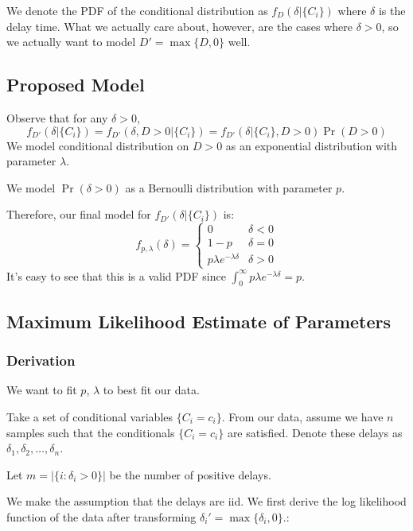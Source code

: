 \documentclass{article}
\begin{document}
We denote the PDF of the conditional distribution as $f_D(\delta|\{C_i\})$ where $\delta$ is the delay time. What we actually care about, however, are
the cases where $\delta > 0$, so we actually want to model $D' = \max \{D, 0\}$ well.

\subsection{Proposed Model}
Observe that for any $\delta > 0$,
$$f_{D'}(\delta | \{C_i\}) = f_{D'}(\delta, D > 0 | \{C_i\}) = f_{D'}(\delta | \{C_i\}, D > 0)\Pr(D > 0)$$
We model conditional distribution on $D > 0$ as an exponential distribution with parameter $\lambda$.

We model $\Pr(\delta > 0)$ as a Bernoulli distribution with parameter $p$.

Therefore, our final model for $f_{D'}(\delta | \{C_i\})$ is:
$$f_{p, \lambda}(\delta) = \begin{cases}
  0 & \delta < 0 \\
  1 - p & \delta = 0 \\
  p\lambda e^{-\lambda \delta} & \delta > 0
\end{cases}$$
It's easy to see that this is a valid PDF since $\int_0^\infty p\lambda e^{-\lambda \delta} = p$.

\subsection{Maximum Likelihood Estimate of Parameters}
\subsubsection{Derivation}
We want to fit $p$, $\lambda$ to best fit our data.

Take a set of conditional variables $\{C_i=c_i\}$. From our data, assume we have $n$ samples such that the conditionals $\{C_i=c_i\}$ are
satisfied. Denote these delays as $\delta_1, \delta_2, \ldots, \delta_n$.

Let $m = |\{i: \delta_i > 0\}|$ be the number of positive delays.

We make the assumption that the delays are iid. We first derive the log likelihood function of the data after transforming $\delta_i' = \max\{\delta_i, 0\}$.:
\end{document}
